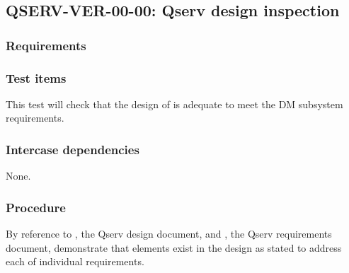 \subsection{\textsc{QSERV-VER-00-00}: Qserv design inspection}
\label{qserv-ver-00-00}

\subsubsection{Requirements}

\subsubsection{Test items}

This test will check that the design of \product{} is adequate to meet the DM subsystem requirements.

\subsubsection{Intercase dependencies}

None.

\subsubsection{Procedure}

By reference to , the Qserv design document, and , the Qserv requirements
document, demonstrate that elements exist in the design as stated to address each of individual requirements.
